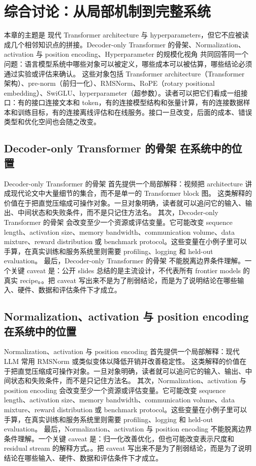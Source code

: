 \documentclass[a4paper]{article}
\begin{document}
\section{综合讨论：从局部机制到完整系统}
本章的主题是 现代 Transformer architecture 与 hyperparameters，但它不应被读成几个相邻知识点的拼接。Decoder-only Transformer 的骨架、Normalization、activation 与 position encoding、Hyperparameter 的规模化视角 共同回答同一个问题：语言模型系统中哪些对象可以被定义，哪些成本可以被估算，哪些结论必须通过实验或评估来确认。
这些对象包括 Transformer architecture（Transformer 架构）、pre-norm（前归一化）、RMSNorm、RoPE（rotary positional embedding）、SwiGLU、hyperparameter（超参数）。读者可以把它们看成一组接口：有的接口连接文本和 token，有的连接模型结构和张量计算，有的连接数据样本和训练目标，有的连接离线评估和在线服务。接口一旦改变，后面的成本、错误类型和优化空间也会随之改变。
\subsection{Decoder-only Transformer 的骨架 在系统中的位置}
Decoder-only Transformer 的骨架 首先提供一个局部解释：视频把 architecture 讲成现代论文中大量细节的集合，而不是单一的 Transformer block 图。 这类解释的价值在于把直觉压缩成可操作对象。一旦对象明确，读者就可以追问它的输入、输出、中间状态和失败条件，而不是只记住方法名。
其次，Decoder-only Transformer 的骨架 会改变至少一个资源或评估变量。它可能改变 sequence length、activation size、memory bandwidth、communication volume、data mixture、reward distribution 或 benchmark protocol。这些变量在小例子里可以手算，在真实训练和服务系统里则需要 profiling、logging 和 held-out evaluation。
最后，Decoder-only Transformer 的骨架 不能脱离边界条件理解。一个关键 caveat 是：公开 slides 总结的是主流设计，不代表所有 frontier models 的真实 recipe。。把 caveat 写出来不是为了削弱结论，而是为了说明结论在哪些输入、硬件、数据和评估条件下才成立。
\subsection{Normalization、activation 与 position encoding 在系统中的位置}
Normalization、activation 与 position encoding 首先提供一个局部解释：现代 LLM 常用 RMSNorm 或类似变体以降低开销并改善稳定性。 这类解释的价值在于把直觉压缩成可操作对象。一旦对象明确，读者就可以追问它的输入、输出、中间状态和失败条件，而不是只记住方法名。
其次，Normalization、activation 与 position encoding 会改变至少一个资源或评估变量。它可能改变 sequence length、activation size、memory bandwidth、communication volume、data mixture、reward distribution 或 benchmark protocol。这些变量在小例子里可以手算，在真实训练和服务系统里则需要 profiling、logging 和 held-out evaluation。
最后，Normalization、activation 与 position encoding 不能脱离边界条件理解。一个关键 caveat 是：归一化改善优化，但也可能改变表示尺度和 residual stream 的解释方式。。把 caveat 写出来不是为了削弱结论，而是为了说明结论在哪些输入、硬件、数据和评估条件下才成立。
\end{document}

